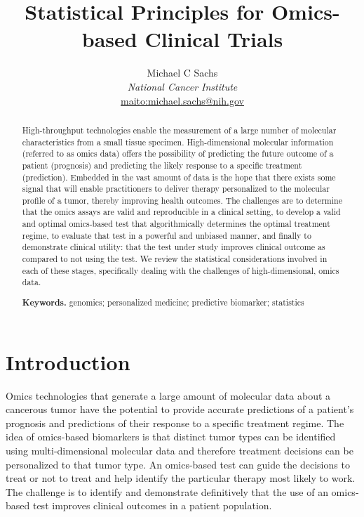 \documentclass[11pt]{article}
\title{\bigskip \bigskip Statistical Principles for Omics-based Clinical Trials}
\author{\Large Michael C Sachs\vspace{0.05in} \\ \normalsize\emph{National Cancer Institute} \\ \footnotesize \url{maito:michael.sachs@nih.gov}\vspace*{0.2in}\\ }
\begin{document}
  
		




\maketitle


\begin{abstract}

\noindent High-throughput technologies enable the measurement of a large number of
molecular characteristics from a small tissue specimen. High-dimensional
molecular information (referred to as omics data) offers the possibility
of predicting the future outcome of a patient (prognosis) and predicting
the likely response to a specific treatment (prediction). Embedded in
the vast amount of data is the hope that there exists some signal that
will enable practitioners to deliver therapy personalized to the
molecular profile of a tumor, thereby improving health outcomes. The
challenges are to determine that the omics assays are valid and
reproducible in a clinical setting, to develop a valid and optimal
omics-based test that algorithmically determines the optimal treatment
regime, to evaluate that test in a powerful and unbiased manner, and
finally to demonstrate clinical utility: that the test under study
improves clinical outcome as compared to not using the test. We review
the statistical considerations involved in each of these stages,
specifically dealing with the challenges of high-dimensional, omics
data.

\smallskip
\noindent \textbf{Keywords.} genomics; personalized medicine; predictive biomarker; statistics

\end{abstract}


\section{Introduction}\label{introduction}

Omics technologies that generate a large amount of molecular data about
a cancerous tumor have the potential to provide accurate predictions of
a patient's prognosis and predictions of their response to a specific
treatment regime. The idea of omics-based biomarkers is that distinct
tumor types can be identified using multi-dimensional molecular data and
therefore treatment decisions can be personalized to that tumor type. An
omics-based test can guide the decisions to treat or not to treat and
help identify the particular therapy most likely to work. The challenge
is to identify and demonstrate definitively that the use of an
omics-based test improves clinical outcomes in a patient population.
\end{document}
